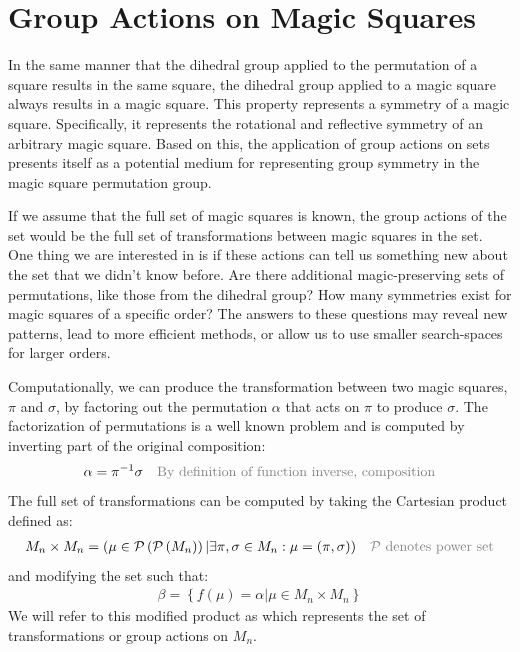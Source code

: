 \documentclass[12pt]{report}
\def\light#1{{\color{light}#1}}
\begin{document}
\section{Group Actions on Magic Squares}

\par In the same manner that the dihedral group applied to the permutation of a square results in
the same square, the dihedral group applied to a magic square always results in a magic square.
This property represents a symmetry of a magic square. Specifically, it represents the rotational
and reflective symmetry of an arbitrary magic square. Based on this, the application of group
actions on sets presents itself as a potential medium for representing group symmetry in the magic
square permutation group.

\par If we assume that the full set of magic squares is known, the group actions of the set would
be the full set of transformations between magic squares in the set. One thing we are interested in
is if these actions can tell us something new about the set that we didn't know before. Are there
additional magic-preserving sets of permutations, like those from the dihedral group? How many
symmetries exist for magic squares of a specific order? The answers to these questions may reveal
new patterns, lead to more efficient methods, or allow us to use smaller search-spaces for larger
orders.

\par Computationally, we can produce the transformation between two magic squares, $\pi$ and
$\sigma$, by factoring out the permutation $\alpha$ that acts on $\pi$ to produce $\sigma$. The
factorization of permutations is a well known problem and is computed by inverting part of the
original composition:
\begin{align}
  \alpha=\pi^{-1}\sigma &  & \text{\light{By definition of function inverse, composition}}
\end{align}
The full set of transformations can be computed by taking the Cartesian product defined as:
\begin{align}
  M_n \times M_n = \left(\mu \in \mathcal{P}\left(\mathcal{P}\left(M_n\right)\right)\vert
  \exists\pi,\sigma\in M_n : \mu = (\pi,\sigma)\right) &  & \text{\light{$\mathcal{P}$ denotes
      power
      set}}
\end{align}
and modifying the set such that:
\begin{align}
  \beta = \left\{f(\mu)=\alpha\vert\mu\in M_n \times M_n\right\}
\end{align}
We will refer to this modified product as  which represents the set of transformations or group
actions on $M_n$.
\end{document}
